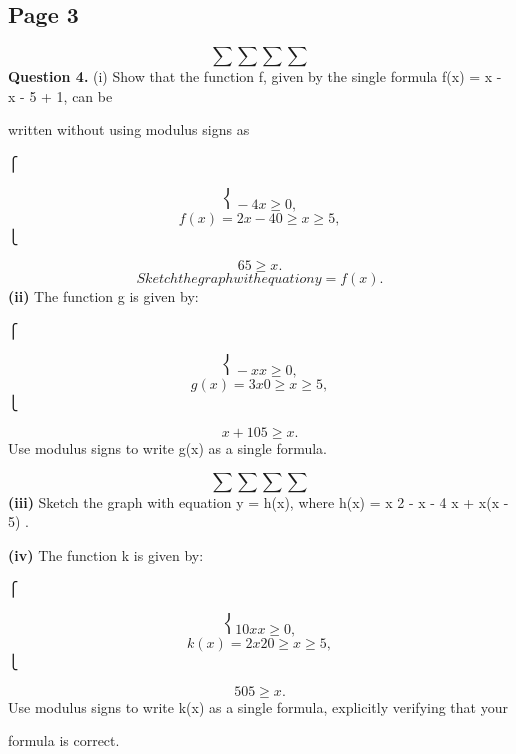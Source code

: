 \documentclass[12pt]{article}
\begin{document}
\subsection*{Page 3}
\begin{flushleft}
\[\sum \sum \sum \sum\]
\bigskip\textbf{Question 4.} (i) Show that the function f, given by the single formula f(x) = \sum x \sum - \sum x - 5 \sum + 1, can be\par
written without using modulus signs as\par
⎧\par
\[⎨ -4 x \geq 0 ,\]
\[f(x) = 2x - 4 0 \geq x \geq 5 ,\]
⎩\par
\[6 5 \geq x .\]
\[Sketch the graph with equation y = f(x).\]
\textbf{(ii)} The function g is given by:\par
⎧\par
\[⎨ -x x \geq 0 ,\]
\[g(x) = 3x 0 \geq x \geq 5 ,\]
⎩\par
\[x + 10 5 \geq x .\]
Use modulus signs to write g(x) as a single formula.\par
\[\sum \sum \sum \sum\]
\textbf{(iii)} Sketch the graph with equation y = h(x), where h(x) = x 2 - x - 4 \sum x \sum + \sum x(x - 5) \sum .\par
\textbf{(iv)} The function k is given by:\par
⎧\par
\[⎨ 10x x \geq 0 ,\]
\[k(x) = 2x 2 0 \geq x \geq 5 ,\]
⎩\par
\[50 5 \geq x .\]
Use modulus signs to write k(x) as a single formula, explicitly verifying that your\par
formula is correct.\par
\end{flushleft}
\end{document}
